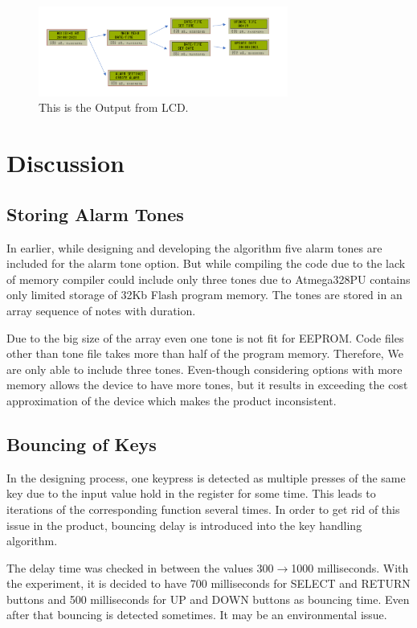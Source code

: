 \documentclass[12pt,twocolumn]{article}
\begin{document}
\begin{center}
    \begin{figure}[h]
    \includegraphics[width=0.73\textwidth]{flow2}
    \caption{This is the Output from LCD.}
    \end{figure}
\end{center}


\twocolumn


\section{Discussion}
    \subsection{Storing Alarm Tones}
In earlier, while designing and developing the algorithm five alarm tones are included for the alarm 
tone option. But while compiling the code due to the lack of memory compiler could include only three
tones due to Atmega328PU contains only limited storage of 32Kb Flash program memory. The tones are 
stored in an array sequence of notes with duration. 

Due to the big size of the array even one tone is not fit for EEPROM. Code files other than tone file
takes more than half of the program memory. Therefore, We are only able to include three tones. 
Even-though considering options with more memory allows the device to have more tones, but it results 
in exceeding the cost approximation of the device which makes the product inconsistent. 
    
    \subsection{Bouncing of Keys}
In the designing process, one keypress is detected as multiple presses of the same key due to the 
input value hold in the register for some time. This leads to iterations of the corresponding function 
several times. In order to get rid of this issue in the product, bouncing delay is introduced into the 
key handling algorithm. 

The delay time was checked in between the values 300$\to$1000 milliseconds. With the experiment, it is
decided to have 700 milliseconds for SELECT and RETURN buttons and 500 milliseconds for UP and DOWN 
buttons as bouncing time. Even after that bouncing is detected sometimes. It may be an environmental 
issue. 
\end{document}
